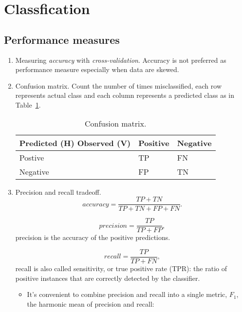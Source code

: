 \documentclass[12pt,oneside,a4paper]{article}
\numberwithin{equation}{section}
\begin{document}
\section{Classfication}

\subsection{Performance measures}
\begin{enumerate}
\item Measuring \emph{accuracy} with \emph{cross-validation}. Accuracy is not preferred as performance measure especially when data are skewed. 

\item Confusion matrix. Count the number of times misclassified, each row represents actual class and each column represents a predicted class as in Table~\ref{confusion}.
\begin{table}[h]
	\centering
	\begin{tabular}{p{2.5cm}p{2cm}p{2cm}}
		Predicted (H) Observed (V)	&  Positive  & Negative \\
		\hline 
		Postive & TP & FN \\
		\hline 
		Negative & FP & TN \\
		\hline 
		
	\end{tabular}
	\caption{Confusion matrix.}
	\label{confusion}
\end{table}

\item Precision and recall tradeoff.\\


\begin{equation*}
accuracy = \frac{TP + TN}{TP + TN + FP + FN}.
\end{equation*}

\begin{equation*}
precision = \frac{TP}{TP + FP},
\end{equation*}
precision is the accuracy of the positive predictions.

\begin{equation*}
recall = \frac{TP}{TP + FN},
\end{equation*}
recall is also called sensitivity, or true positive rate (TPR): the ratio of positive instances that are correctly detected by the classifier. 

\begin{itemize}
\item It's convenient to combine precision and recall into a single metric, $F_1$, the harmonic mean of precision and recall: 


\end{itemize}
\end{enumerate}
\end{document}

